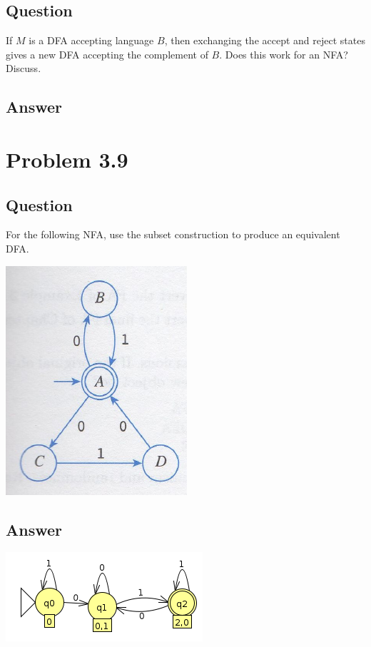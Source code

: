 \documentclass[12pt, a4paper]{article}
\begin{document}
\subsection{Question}
If $M$ is a DFA accepting language $B$, then exchanging the accept and reject states gives a new DFA accepting the complement of $B$. Does this work for an NFA? Discuss.
\subsection{Answer}

\section{Problem 3.9}
\subsection{Question}
For the following NFA, use the subset construction to produce an equivalent DFA.
\begin{center}
\includegraphics[scale=0.7]{3.9problem}
\end{center}
\subsection{Answer}
\begin{center}
\includegraphics[scale=0.7]{3.9}
\end{center}
\end{document}
